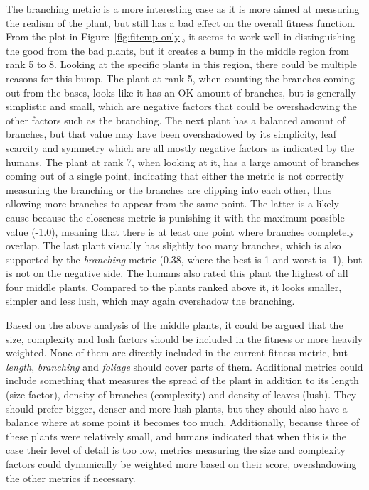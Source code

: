 The branching metric is a more interesting case as it is more aimed at measuring the realism of the plant, but still has a bad effect on the overall fitness function.
From the plot in Figure~\ref{fig:fitcmp-only}, it seems to work well in distinguishing the good from the bad plants, but it creates a bump in the middle region from rank 5 to 8.
Looking at the specific plants in this region, there could be multiple reasons for this bump.
The plant at rank 5, when counting the branches coming out from the bases, looks like it has an OK amount of branches, but is generally simplistic and small, which are negative factors that could be overshadowing the other factors such as the branching.
The next plant has a balanced amount of branches, but that value may have been overshadowed by its simplicity, leaf scarcity and symmetry which are all mostly negative factors as indicated by the humans.
The plant at rank 7, when looking at it, has a large amount of branches coming out of a single point, indicating that either the metric is not correctly measuring the branching or the branches are clipping into each other, thus allowing more branches to appear from the same point.
The latter is a likely cause because the closeness metric is punishing it with the maximum possible value (-1.0), meaning that there is at least one point where branches completely overlap.
The last plant visually has slightly too many branches, which is also supported by the \textit{branching} metric (0.38, where the best is 1 and worst is -1), but is not on the negative side.
The humans also rated this plant the highest of all four middle plants.
Compared to the plants ranked above it, it looks smaller, simpler and less lush, which may again overshadow the branching.

Based on the above analysis of the middle plants, it could be argued that the size, complexity and lush factors should be included in the fitness or more heavily weighted.
None of them are directly included in the current fitness metric, but \textit{length}, \textit{branching} and \textit{foliage} should cover parts of them.
Additional metrics could include something that measures the spread of the plant in addition to its length (size factor), density of branches (complexity) and density of leaves (lush).
They should prefer bigger, denser and more lush plants, but they should also have a balance where at some point it becomes too much.
Additionally, because three of these plants were relatively small, and humans indicated that when this is the case their level of detail is too low, metrics measuring the size and complexity factors could dynamically be weighted more based on their score, overshadowing the other metrics if necessary.

